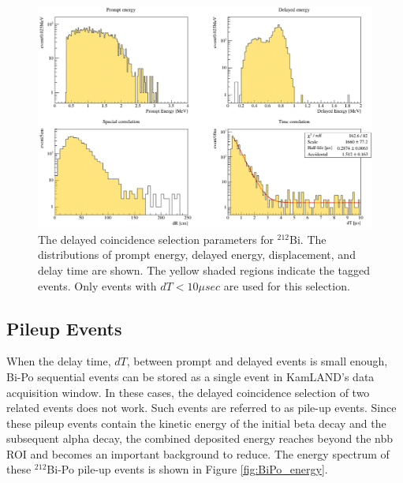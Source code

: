 \begin{figure}[htb]
	\centering
	\includegraphics[scale=0.45]{bi212.png}
	\caption{The delayed coincidence selection parameters for $^{212}$Bi. The distributions of prompt energy, delayed energy, displacement, and delay time are shown. The yellow shaded regions indicate the tagged events. Only events with $dT<10\mu sec$ are used for this selection.}
	\label{fig:BiPo212}
\end{figure}
\subsection*{Pileup Events}
\label{sec:dpfit}
When the delay time, $dT$, between prompt and delayed events is small enough, Bi-Po sequential events can be stored as a single event in KamLAND's data acquisition window. In these cases, the delayed coincidence selection of two related events does not work. Such events are referred to as pile-up events. Since these pileup events contain the kinetic energy of the initial beta decay and the subsequent alpha decay, the combined deposited energy reaches beyond the \0nbb ROI and becomes an important background to reduce. The energy spectrum of these $^{212}$Bi-Po pile-up events is shown in Figure \ref{fig:BiPo_energy}.

